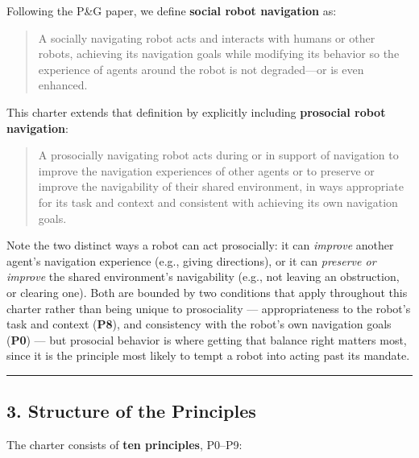 \documentclass[utf8]{frontiers_suppmat} %
\begin{document}
Following the P\&G paper, we define \textbf{social robot navigation} as:

\begin{quote}
A socially navigating robot acts and interacts with humans or other
robots, achieving its navigation goals while modifying its behavior so
the experience of agents around the robot is not degraded---or is even
enhanced.
\end{quote}

This charter extends that definition by explicitly including
\textbf{prosocial robot navigation}:

\begin{quote}
A prosocially navigating robot acts during or in support of navigation
to improve the navigation experiences of other agents or to preserve or
improve the navigability of their shared environment, in ways
appropriate for its task and context and consistent with achieving its
own navigation goals.
\end{quote}

Note the two distinct ways a robot can act prosocially: it can
\emph{improve} another agent's navigation experience (e.g., giving
directions), or it can \emph{preserve or improve} the shared
environment's navigability (e.g., not leaving an obstruction, or
clearing one). Both are bounded by two conditions that apply throughout
this charter rather than being unique to prosociality ---
appropriateness to the robot's task and context (\textbf{P8}), and
consistency with the robot's own navigation goals (\textbf{P0}) --- but
prosocial behavior is where getting that balance right matters most,
since it is the principle most likely to tempt a robot into acting past
its mandate.

\begin{center}\rule{0.5\linewidth}{0.5pt}\end{center}

\subsection{3. Structure of the
Principles}\label{structure-of-the-principles}

The charter consists of \textbf{ten principles}, P0--P9:
\end{document}
